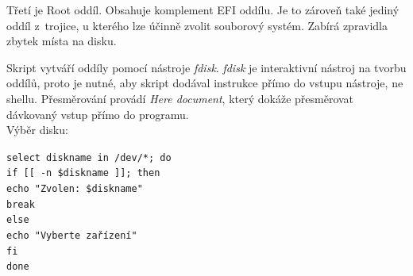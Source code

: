 \documentclass[12pt,a4paper,twoside,]{article}
\begin{document}
{Třetí je Root oddíl. Obsahuje komplement EFI oddílu. Je to zároveň také jediný oddíl z~trojice, 
u kterého lze účinně zvolit souborový systém. Zabírá zpravidla zbytek místa na disku.}

{Skript vytváří oddíly pomocí nástroje \textit{fdisk}. \textit{fdisk} je interaktivní nástroj na tvorbu \\oddílů, proto je nutné, aby skript dodával instrukce přímo do vstupu nástroje, ne shellu. Přesměrování provádí \textit{Here document}, který dokáže přesměrovat dávkovaný vstup přímo do programu.\\ Výběr disku:}

\texttt{select diskname in /dev/*; do\\}
\texttt{if [[ -n \$diskname ]]; then\\}
\texttt{\hspace*{2em}echo "Zvolen: \$diskname"\\}
\texttt{\hspace*{2em}break\\}
\texttt{else\\}
\texttt{\hspace*{2em}echo "Vyberte zařízení"\\}
\texttt{fi\\}
\texttt{done\\}
\end{document}
